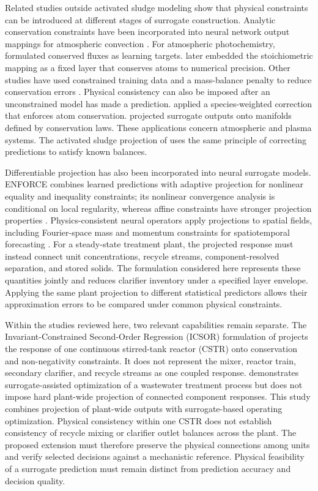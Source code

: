\documentclass[a4paper,fleqn]{cas-sc}
\begin{document}
Related studies outside activated sludge modeling show that physical constraints can be introduced at different stages of surrogate construction. Analytic conservation constraints have been incorporated into neural network output mappings for atmospheric convection \citep{Beucler2021}. For atmospheric photochemistry, \citet{SturmWexler2020} formulated conserved fluxes as learning targets. \citet{SturmWexler2022} later embedded the stoichiometric mapping as a fixed layer that conserves atoms to numerical precision. Other studies have used constrained training data and a mass-balance penalty to reduce conservation errors \citep{Ruckstuhl2021}. Physical consistency can also be imposed after an unconstrained model has made a prediction. \citet{SturmSilva2025} applied a species-weighted correction that enforces atom conservation. \citet{Valente2025} projected surrogate outputs onto manifolds defined by conservation laws. These applications concern atmospheric and plasma systems. The activated sludge projection of \citet{Selerio2026} uses the same principle of correcting predictions to satisfy known balances.

Differentiable projection has also been incorporated into neural surrogate models. ENFORCE combines learned predictions with adaptive projection for nonlinear equality and inequality constraints; its nonlinear convergence analysis is conditional on local regularity, whereas affine constraints have stronger projection properties \citep{LastrucciSchweidtmann2026}. Physics-consistent neural operators apply projections to spatial fields, including Fourier-space mass and momentum constraints for spatiotemporal forecasting \citep{Xu2025}. For a steady-state treatment plant, the projected response must instead connect unit concentrations, recycle streams, component-resolved separation, and stored solids. The formulation considered here represents these quantities jointly and reduces clarifier inventory under a specified layer envelope. Applying the same plant projection to different statistical predictors allows their approximation errors to be compared under common physical constraints.

Within the studies reviewed here, two relevant capabilities remain separate. The Invariant-Constrained Second-Order Regression (ICSOR) formulation of \citet{Selerio2026} projects the response of one continuous stirred-tank reactor (CSTR) onto conservation and non-negativity constraints. It does not represent the mixer, reactor train, secondary clarifier, and recycle streams as one coupled response. \citet{He2023} demonstrates surrogate-assisted optimization of a wastewater treatment process but does not impose hard plant-wide projection of connected component responses. This study combines projection of plant-wide outputs with surrogate-based operating optimization. Physical consistency within one CSTR does not establish consistency of recycle mixing or clarifier outlet balances across the plant. The proposed extension must therefore preserve the physical connections among units and verify selected decisions against a mechanistic reference. Physical feasibility of a surrogate prediction must remain distinct from prediction accuracy and decision quality.
\end{document}
